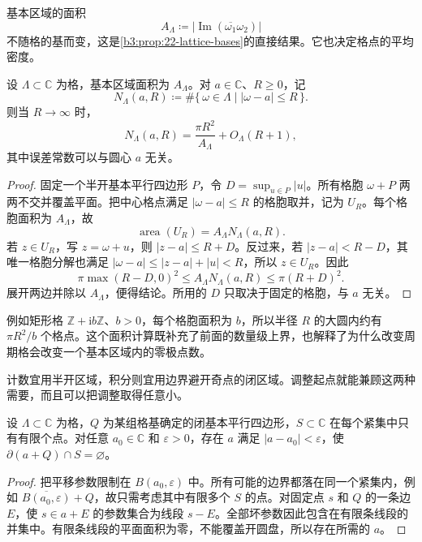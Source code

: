 \ProseParagraphBreak
基本区域的面积
\[
 A_\Lambda\coloneqq
 \bigl|\operatorname{Im}(\overline{\omega_1}\omega_2)\bigr|
\]
不随格的基而变，这是\cref{b3:prop:22-lattice-bases}的直接结果。它也决定格点的平均密度。

\begin{proposition}\label{b3:prop:22-lattice-counting}
设 \(\Lambda\subset\mathbb C\) 为格，基本区域面积为 \(A_\Lambda\)。对 \(a\in\mathbb C\)、\(R\ge0\)，记
\[
 N_\Lambda(a,R)\coloneqq
 \#\{\,\omega\in\Lambda\mid |\omega-a|\le R\,\}.
\]
则当 \(R\to\infty\) 时，
\[
 N_\Lambda(a,R)=\frac{\pi R^2}{A_\Lambda}+O_\Lambda(R+1),
\]
其中误差常数可以与圆心 \(a\) 无关。
\end{proposition}
\begin{proof}
固定一个半开基本平行四边形 \(P\)，令 \(D=\sup_{u\in P}|u|\)。所有格胞 \(\omega+P\) 两两不交并覆盖平面。把中心格点满足 \(|\omega-a|\le R\) 的格胞取并，记为 \(U_R\)。每个格胞面积为 \(A_\Lambda\)，故
\[
 \operatorname{area}(U_R)=A_\Lambda N_\Lambda(a,R).
\]
若 \(z\in U_R\)，写 \(z=\omega+u\)，则 \(|z-a|\le R+D\)。反过来，若 \(|z-a|<R-D\)，其唯一格胞分解也满足 \(|\omega-a|\le |z-a|+|u|<R\)，所以 \(z\in U_R\)。因此
\[
 \pi\max(R-D,0)^2
 \le A_\Lambda N_\Lambda(a,R)
 \le\pi(R+D)^2.
\]
展开两边并除以 \(A_\Lambda\)，便得结论。所用的 \(D\) 只取决于固定的格胞，与 \(a\) 无关。
\end{proof}

例如矩形格 \(\mathbb Z+\mathrm{i}b\mathbb Z\)、\(b>0\)，每个格胞面积为 \(b\)，所以半径 \(R\) 的大圆内约有 \(\pi R^2/b\) 个格点。这个面积计算既补充了前面的数量级上界，也解释了为什么改变周期格会改变一个基本区域内的零极点数。

\ProseParagraphBreak
计数宜用半开区域，积分则宜用边界避开奇点的闭区域。调整起点就能兼顾这两种需要，而且可以把调整取得任意小。

\begin{lemma}\label{b3:lem:22-boundary-avoidance}
设 \(\Lambda\subset\mathbb C\) 为格，\(Q\) 为某组格基确定的闭基本平行四边形，\(S\subset\mathbb C\) 在每个紧集中只有有限个点。对任意 \(a_0\in\mathbb C\) 和 \(\varepsilon>0\)，存在 \(a\) 满足 \(|a-a_0|<\varepsilon\)，使 \(\partial(a+Q)\cap S=\varnothing\)。
\end{lemma}
\begin{proof}
把平移参数限制在 \(B(a_0,\varepsilon)\) 中。所有可能的边界都落在同一个紧集内，例如 \(\overline{B(a_0,\varepsilon)}+Q\)，故只需考虑其中有限多个 \(S\) 的点。对固定点 \(s\) 和 \(Q\) 的一条边 \(E\)，使 \(s\in a+E\) 的参数集合为线段 \(s-E\)。全部坏参数因此包含在有限条线段的并集中。有限条线段的平面面积为零，不能覆盖开圆盘，所以存在所需的 \(a\)。
\end{proof}

